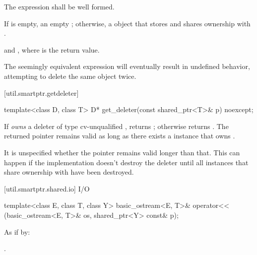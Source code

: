 \begin{itemdescr}
\pnum\requires  The expression  shall
be well formed.

\pnum\returns  If  is empty, an empty ; otherwise, a
 object that stores  and shares
ownership with .

\pnum
\postconditions {} and
, where  is the return value.

\pnum \begin{note} The seemingly equivalent expression
 will eventually result in
undefined behavior, attempting to delete the same object twice. \end{note}
\end{itemdescr}

[util.smartptr.getdeleter]{}

%
\begin{itemdecl}
template<class D, class T> D* get_deleter(const shared_ptr<T>& p) noexcept;
\end{itemdecl}

\begin{itemdescr}
\pnum\returns  If  \textit{owns} a deleter  of type cv-unqualified
, returns ; otherwise returns .
The returned
pointer remains valid as long as there exists a  instance
that owns . \begin{note} It is unspecified whether the pointer
remains valid longer than that. This can happen if the implementation doesn't destroy
the deleter until all  instances that share ownership with
 have been destroyed. \end{note}
\end{itemdescr}

[util.smartptr.shared.io]{ I/O}

%
\begin{itemdecl}
template<class E, class T, class Y>
  basic_ostream<E, T>& operator<< (basic_ostream<E, T>& os, shared_ptr<Y> const& p);
\end{itemdecl}

\begin{itemdescr}
\pnum\effects As if by: 

\pnum\returns  {}.
\end{itemdescr}

